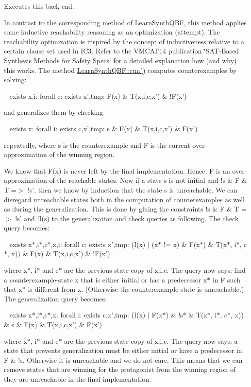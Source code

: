 Executes this back-\/end. 

In contrast to the corresponding method of \hyperlink{classLearnSynthQBF}{Learn\-Synth\-Q\-B\-F}, this method applies some inductive reachability reasoning as an optimization (attempt). The reachability optimization is inspired by the concept of inductiveness relative to a certain clause set used in I\-C3. Refer to the V\-M\-C\-A\-I'14 publication \char`\"{}\-S\-A\-T-\/\-Based Synthesis Methods for Safety
\-Specs\char`\"{} for a detailed explanation how (and why) this works. The method \hyperlink{classLearnSynthQBF_aed85bb2fe317a5fdc7eef71fe598c606}{Learn\-Synth\-Q\-B\-F\-::run()} computes counterexamples by solving\-: \par
 ~ exists x,i\-: forall c\-: exists x',tmp\-: F(x) \& T(x,i,c,x') \& !\-F(x') \par
 and generalizes them by checking \par
 ~ exists x\-: forall i\-: exists c,x',tmp\-: s \& F(x) \& T(x,i,c,x') \& F(x') \par
 repeatedly, where s is the counterexample and F is the current over-\/approximation of the winning region.

We know that F(x) is never left by the final implementation. Hence, F is an over-\/approximation of the reachable states. Now if a state s is not initial and !s \& F \& T =$>$ !s', then we know by induction that the state s is unreachable. We can disregard unreachable states both in the computation of counterexamples as well as during the generalization. This is done by gluing the constraints !s \& F \& T =$>$ !s' and !\-I(s) to the generalization and check queries as following. The check query becomes\-: \par
 ~ exists x$\ast$,i$\ast$,c$\ast$,x,i\-: forall c\-: exists x',tmp\-: (I(x) $|$ (x$\ast$ != x) \& F(x$\ast$) \& T(x$\ast$, i$\ast$, c$\ast$, x)) \& F(x) \& T(x,i,c,x') \& !\-F(x') \par
 where x$\ast$, i$\ast$ and c$\ast$ are the previous-\/state copy of x,i,c. The query now says\-: find a counterexample-\/state x that is either initial or has a predecessor x$\ast$ in F such that x$\ast$ is different from x. (Otherwise the counterexample-\/state is unreachable.) The generalization query becomes\-: \par
 ~ exists x$\ast$,i$\ast$,c$\ast$,x\-: forall i\-: exists c,x',tmp\-: (I(x) $|$ F(x$\ast$) \& !s$\ast$ \& T(x$\ast$, i$\ast$, c$\ast$, x)) \& s \& F(x) \& T(x,i,c,x') \& F(x') \par
 where x$\ast$, i$\ast$ and c$\ast$ are the previous-\/state copy of x,i,c. The query now says\-: a state that prevents generalization must be either initial or have a predecessor in F \& !s. Otherwise it is unreachable and we do not care. This means that we can remove states that are winning for the protagonist from the winning region of they are unreachable in the final implementation.

